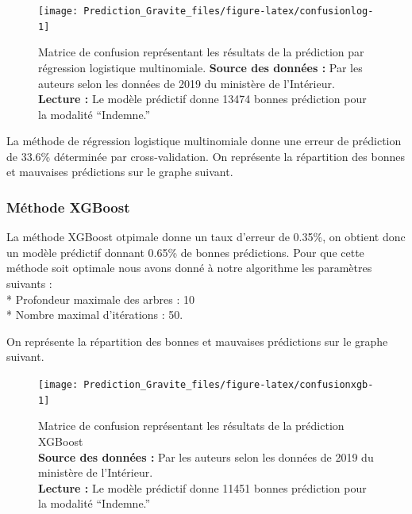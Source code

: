 \documentclass[french,]{tp}
\begin{document}
\begin{figure}[ht!]

{\centering \texttt{[image: Prediction\_Gravite\_files/figure-latex/confusionlog-1]} 

}

\caption{Matrice de confusion représentant les résultats de la prédiction par régression logistique multinomiale.
\textbf{Source des données :} Par les auteurs selon les données de 2019 du ministère de l'Intérieur.\\
\textbf{Lecture :} Le modèle prédictif donne 13474 bonnes prédiction pour la modalité ``Indemne.''}\label{fig:confusionlog}
\end{figure}

La méthode de régression logistique multinomiale donne une erreur de prédiction de 33.6\% déterminée par cross-validation.
On représente la répartition des bonnes et mauvaises prédictions sur le graphe suivant.





\newpage

\hypertarget{xgboost}{%
\subsubsection{Méthode XGBoost}\label{xgboost}}

La méthode XGBoost otpimale donne un taux d'erreur de 0.35\%, on obtient donc un modèle prédictif donnant 0.65\% de bonnes prédictions. Pour que cette méthode soit optimale nous avons donné à notre algorithme les paramètres suivants :\\
* Profondeur maximale des arbres : 10\\
* Nombre maximal d'itérations : 50.

On représente la répartition des bonnes et mauvaises prédictions sur le graphe suivant.

\begin{figure}[ht!]

{\centering \texttt{[image: Prediction\_Gravite\_files/figure-latex/confusionxgb-1]} 

}

\caption{Matrice de confusion représentant les résultats de la prédiction XGBoost\\
\textbf{Source des données :} Par les auteurs selon les données de 2019 du ministère de l'Intérieur.\\
\textbf{Lecture :} Le modèle prédictif donne 11451 bonnes prédiction pour la modalité ``Indemne.''}\label{fig:confusionxgb}
\end{figure}
\end{document}
